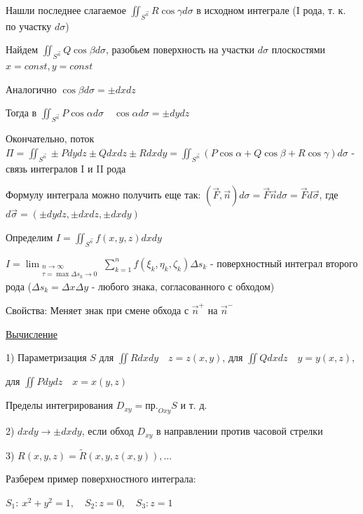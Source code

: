 \documentclass[12pt]{article}
\begin{document}
    Нашли последнее слагаемое $\iint_{S^{\overrightarrow{n}}} R\cos\gamma d\sigma$ в исходном интеграле (I рода, т. к. по участку $d\sigma$)

    Найдем $\iint_{S^{\overrightarrow{n}}} Q\cos\beta d\sigma$, разобьем поверхность на участки $d\sigma$ плоскостями $x = const, y = const$

    Аналогично $\cos\beta d\sigma = \pm dxdz$

    Тогда в $\iint_{S^{\overrightarrow{n}}} P\cos\alpha d\sigma \quad \cos\alpha d\sigma = \pm dydz$

    Окончательно, поток $\Pi = \iint_{S^{\overrightarrow{n}}} \pm Pdydz \pm Qdxdz \pm Rdxdy = \iint_{S^{\overrightarrow{n}}} (P\cos\alpha + Q\cos\beta + R\cos\gamma) d\sigma$ - связь интегралов I и II рода

    \Nota Формулу интеграла можно получить еще так: $(\overrightarrow{F}, \overrightarrow{n})d\sigma = \overrightarrow{F}\overrightarrow{n}d\sigma = \overrightarrow{F}d\overrightarrow{\sigma}$, где $d\overrightarrow{\sigma} = (\pm dydz, \pm dxdz, \pm dxdy)$


    Определим $I = \iint_{S^{\overrightarrow{n}}} f(x, y, z) dxdy$

    $I = \lim_{\substack{n \to \infty \\ \tau = \max \Delta s_k \to 0}} \sum_{k=1}^n f(\xi_k, \eta_k, \zeta_k) \Delta s_k$ - поверхностный интеграл второго рода
    ($\Delta s_k = \Delta x\Delta y$ - любого знака, согласованного с обходом)

    Свойства: Меняет знак при смене обхода с $\overrightarrow{n}^+$ на $\overrightarrow{n}^-$

    \underline{Вычисление}

    1) Параметризация $S$ \quad для $\iint Rdxdy \quad z = z(x, y)$, для $\iint Qdxdz \quad y = y(x, z)$,

    для $\iint Pdydz \quad x = x(y, z)$

    Пределы интегрирования $D_{xy} = \text{пр.}_{Oxy} S$ и т. д.

    2) $dxdy \to \pm dxdy$, если обход $D_{xy}$ в направлении против часовой стрелки

    3) $R(x, y, z) = \tilde{R}(x, y, z(x, y)), \dots$




    Разберем пример поверхностного интеграла:

    \Exs $S_1:\ x^2 + y^2 = 1, \quad S_2: z = 0, \quad S_3: z = 1$
\end{document}
